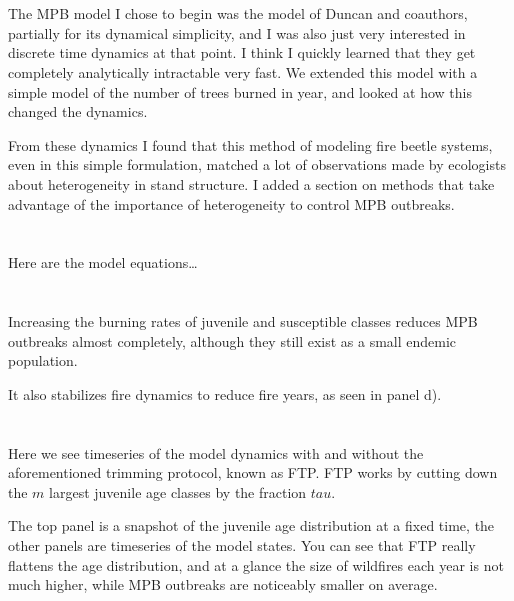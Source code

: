 \documentclass{article}
\begin{document}
\section{}

The MPB model I chose to begin was the model of Duncan and coauthors, partially for its dynamical simplicity, and I was also just very interested in discrete time dynamics at that point. I think I quickly learned that they get completely analytically intractable very fast. We extended this model with a simple model of the number of trees burned in year, and looked at how this changed the dynamics.

From these dynamics I found that this method of modeling fire beetle systems, even in this simple formulation, matched a lot of observations made by ecologists about heterogeneity in stand structure. I added a section on methods that take advantage of the importance of heterogeneity to control MPB outbreaks.



\section{}

Here are the model equations\dots


\section{}

Increasing the burning rates of juvenile and susceptible classes reduces MPB outbreaks almost completely, although they still exist as a small endemic population.

It also stabilizes fire dynamics to reduce fire years, as seen in panel d).

\section{}

Here we see timeseries of the model dynamics with and without the aforementioned trimming protocol, known as FTP. FTP works by cutting down the $m$ largest juvenile age classes by the fraction $tau$.

The top panel is a snapshot of the juvenile age distribution at a fixed time, the other panels are timeseries of the model states. You can see that FTP really flattens the age distribution, and at a glance the size of wildfires each year is not much higher, while MPB outbreaks are noticeably smaller on average.  
\end{document}
